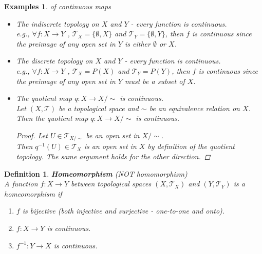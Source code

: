 \documentclass[11pt]{book} %
\newtheorem{definition}{Definition}[section]
\newtheorem*{examples*}{Examples}
\begin{document}
\begin{examples*} of continuous maps
    \begin{itemize}
        \item The indiscrete topology on \( X \) and \( Y \) - every function is continuous. \\
            e.g., \( \forall f: X \to Y \) , \( \mathcal{T}_X = \{ \emptyset, X \} \) and \( \mathcal{T}_Y = \{ \emptyset, Y \} \), 
            then \( f \) is continuous since the preimage of any open set in \( Y \) is either \( \emptyset \) or \( X \).

        \item The discrete topology on \( X \) and \( Y \) - every function is continuous. \\
            e.g., \( \forall f: X \to Y \) , \( \mathcal{T}_X = P(X) \) and \( \mathcal{T}_Y = P(Y) \), 
            then \( f \) is continuous since the preimage of any open set in \( Y \) must be a subset of \( X \).

        \item The quotient map \( q: X \to X/\sim \) is continuous. \\
            Let \( (X, \mathcal{T}) \) be a topological space and \( \sim \) be an equivalence relation on \( X \). \\
            Then the quotient map \( q: X \to X/\sim \) is continuous.
            \begin{proof}
                Let \( U \in \mathcal{T}_{X/\sim} \) be an open set in \( X/\sim \). \\
                Then \( q^{-1}(U) \in \mathcal{T}_X \) is an open set in \( X \) by definition of the quotient topology. 
                The same argument holds for the other direction.
            \end{proof}
    \end{itemize}
\end{examples*}

\begin{definition}{\textbf{Homeomorphism} (NOT homomorphism)}\label{def:homeomorphism} \\ 
    A function \( f: X \to Y \) between topological spaces \( (X, \mathcal{T}_X) \) and \( (Y, \mathcal{T}_Y) \) is a homeomorphism if
    \begin{enumerate}
        \item \( f \) is bijective (both injective and surjective - one-to-one and onto).
        \item \( f : X \to Y \) is continuous.
        \item \( f^{-1} : Y \to X \) is continuous.
    \end{enumerate}
\end{definition}
\end{document}
